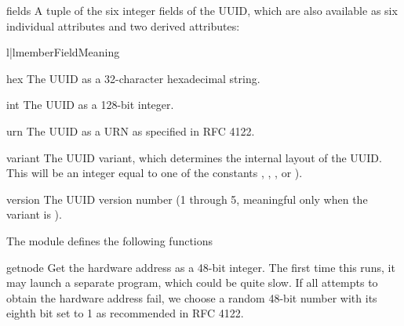 \begin{memberdesc}{fields}
A tuple of the six integer fields of the UUID, which are also available
as six individual attributes and two derived attributes:

\begin{tableii}{l|l}{member}{Field}{Meaning}
\end{tableii}


\end{memberdesc}

\begin{memberdesc}{hex}
The UUID as a 32-character hexadecimal string.
\end{memberdesc}

\begin{memberdesc}{int}
The UUID as a 128-bit integer.
\end{memberdesc}

\begin{memberdesc}{urn}
The UUID as a URN as specified in RFC 4122.
\end{memberdesc}

\begin{memberdesc}{variant}
The UUID variant, which determines the internal layout of the UUID.
This will be an integer equal to one of the constants
,
, , or
).
\end{memberdesc}

\begin{memberdesc}{version}
The UUID version number (1 through 5, meaningful only
when the variant is ).
\end{memberdesc}

The  module defines the following functions

\begin{funcdesc}{getnode}{}
Get the hardware address as a 48-bit integer.  The first time this runs,
it may launch a separate program, which could be quite slow.  If all
attempts to obtain the hardware address fail, we choose a random 48-bit
number with its eighth bit set to 1 as recommended in RFC 4122.
\end{funcdesc}

